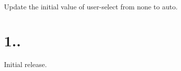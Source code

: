 
\begin{DoxyItemize}
\item Update the initial value of {\ttfamily user-\/select} from {\ttfamily none} to {\ttfamily auto}.
\end{DoxyItemize}

\section*{1..}


\begin{DoxyItemize}
\item Initial release. 
\end{DoxyItemize}
